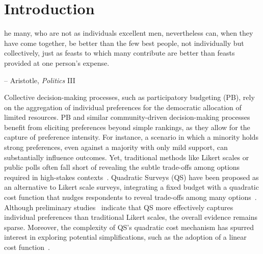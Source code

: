 \section{Introduction}

\begin{displayquote}
[T]he many, who are not as individuals excellent men, nevertheless can, when they have come together, be better than the few best people, not individually but collectively, just as feasts to which many contribute are better than feasts provided at one person's expense.

\begin{flushright}
-- Aristotle, \textit{Politics} III
\end{flushright}
\end{displayquote}

Collective decision-making processes, such as participatory budgeting (PB)\cite{desousasantosParticipatoryBudgetingPorto1998}, rely on the aggregation of individual preferences for the democratic allocation of limited resources. PB and similar community-driven decision-making processes benefit from eliciting preferences beyond simple rankings, as they allow for the capture of preference intensity. For instance, a scenario in which a minority holds strong preferences, even against a majority with only mild support, can substantially influence outcomes. Yet, traditional methods like Likert scales or public polls often fall short of revealing the subtle trade-offs among options required in high-stakes contexts~\cite{quarfoot2017quadratic,posner2017quadratic, krosnick1999survey}. Quadratic Surveys (QS) have been proposed as an alternative to Likert scale surveys, integrating a fixed budget with a quadratic cost function that nudges respondents to reveal trade-offs among many options~\cite{chengCanShowWhat2021, quarfoot2017quadratic, cavaille2024cares}. Although preliminary studies~\cite{chengCanShowWhat2021, cavaille2024cares} indicate that QS more effectively captures individual preferences than traditional Likert scales, the overall evidence remains sparse. Moreover, the complexity of QS’s quadratic cost mechanism has spurred interest in exploring potential simplifications, such as the adoption of a linear cost function~\cite{cavaille2024cares, chengOrganizeThenVote2025}.


